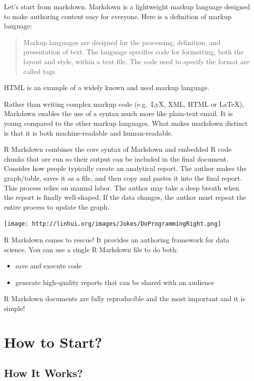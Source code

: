 \documentclass[]{book}
\providecommand{\tightlist}{%
  \setlength{\itemsep}{0pt}\setlength{\parskip}{0pt}}
\theoremstyle{definition}
\theoremstyle{definition}
\theoremstyle{remark}
\begin{document}
Let's start from markdown. Markdown is a lightweight markup language
designed to make authoring content easy for everyone. Here is a
definition of markup language:

\begin{quote}
Markup languages are designed for the processing, definition, and
presentation of text. The language specifies code for formatting, both
the layout and style, within a text file. The code used to specify the
format are called tags.
\end{quote}

HTML is an example of a widely known and used markup language.

Rather than writing complex markup code (e.g.~LyX, XML, HTML or LaTeX),
Markdown enables the use of a syntax much more like plain-text email. It
is young compared to the other markup languages. What makes markdown
distinct is that it is both machine-readable and human-readable.

R Markdown combines the core syntax of Markdown and embedded R code
chunks that are run so their output can be included in the final
document. Consider how people typically create an analytical report. The
author makes the graph/table, saves it as a file, and then copy and
pastes it into the final report. This process relies on manual labor.
The author may take a deep breath when the report is finally
well-shaped. If the data changes, the author must repeat the entire
process to update the graph.

\texttt{[image: http://linhui.org/images/Jokes/DoProgrammingRight.png]}

R Markdown comes to rescue! It provides an authoring framework for data
science. You can use a single R Markdown file to do both:

\begin{itemize}
\tightlist
\item
  save and execute code
\item
  generate high-quality reports that can be shared with an audience
\end{itemize}

R Markdown documents are fully reproducible and the most important and
it is simple!

\section{How to Start?}\label{how-to-start}

\subsection{How It Works?}\label{how-it-works}
\end{document}
